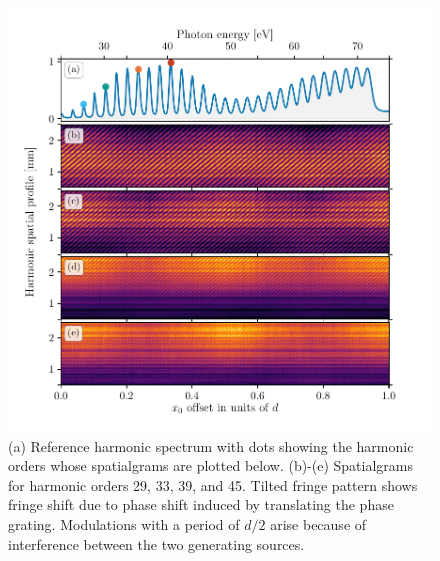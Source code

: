 \begin{figure}
	\centering
	\includegraphics[width=1.0\textwidth]{figures/Two_source/harmonic_spatialgrams.pdf}
	\caption[Reference harmonic spectrum and spatialgrams for various harmonic orders]{(a) Reference harmonic spectrum with dots showing the harmonic orders whose spatialgrams are plotted below. (b)-(e) Spatialgrams for harmonic orders 29, 33, 39, and 45.  Tilted fringe pattern shows fringe shift due to phase shift induced by translating the phase grating. Modulations with a period of $d/2$ arise because of interference between the two generating sources.}
	\label{fig:harmonic_spatialgrams}
\end{figure}

